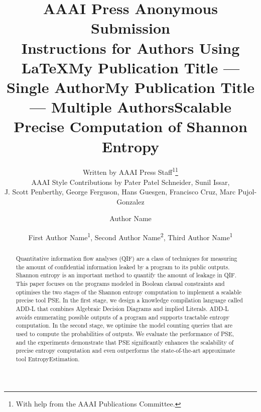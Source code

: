 \documentclass[letterpaper]{article} %
\title{AAAI Press Anonymous Submission\\Instructions for Authors Using \LaTeX{}}
\author{
Written by AAAI Press Staff\textsuperscript{\rm 1}\thanks{With help from the AAAI Publications Committee.}\\
AAAI Style Contributions by Pater Patel Schneider,
Sunil Issar,\\
J. Scott Penberthy,
George Ferguson,
Hans Guesgen,
Francisco Cruz\equalcontrib,
Marc Pujol-Gonzalez\equalcontrib
}
\title{My Publication Title --- Single Author}
\author {
Author Name
}
\title{My Publication Title --- Multiple Authors}
\author {
First Author Name\textsuperscript{\rm 1},
Second Author Name\textsuperscript{\rm 2},
Third Author Name\textsuperscript{\rm 1}
}
\begin{document}
\title{Scalable Precise Computation of Shannon Entropy} 
%


\begin{abstract}
	Quantitative information flow analyses (QIF) are a class of techniques for measuring the amount of confidential information leaked by a program to its public outputs. 
	Shannon entropy is an important method to quantify the amount of leakage in QIF.
	This paper focuses on the programs modeled in Boolean clausal constraints and optimises the two stages of the Shannon entropy computation to implement a scalable precise tool PSE.
	In the first stage, we design a knowledge compilation language called ADD-L that combines Algebraic Decision Diagrams and implied Literals.
	ADD-L avoids enumerating possible outputs of a program and supports tractable entropy computation. 
	In the second stage, we optimise the model counting queries that are used to compute the probabilities of outputs. 
	We evaluate the performance of PSE, and the experiments demonstrate that PSE significantly enhances the scalability of precise entropy computation and even outperforms the state-of-the-art approximate tool EntropyEstimation.
\end{abstract}




















\end{document}
